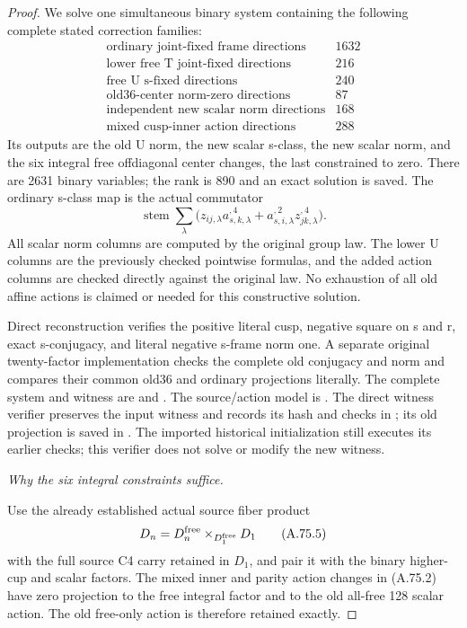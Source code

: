 \begin{proof}
We solve one simultaneous binary system containing the following
complete stated correction families:
\[
\begin{array}{c|r}
 \text{ordinary joint-fixed frame directions}&1632\\
 \text{lower free T joint-fixed directions}&216\\
 \text{free U s-fixed directions}&240\\
 \text{old36-center norm-zero directions}&87\\
 \text{independent new scalar norm directions}&168\\
 \text{mixed cusp-inner action directions}&288
\end{array}
 \tag{A.75.3}
\]
Its outputs are the old U norm, the new scalar s-class, the new
scalar norm, and the six integral free offdiagonal center changes,
the last constrained to zero. There are 2631 binary variables;
the rank is 890 and an exact solution is saved. The ordinary
s-class map is the actual commutator
\[
 \operatorname{stem}\sum_{\lambda}
     \bigl(z_{ij,\lambda}a_{s,k,\lambda}^{,4}
            +a_{s,i,\lambda}^{,2}z_{jk,\lambda}^{,4}\bigr).
 \tag{A.75.4}
\]
All scalar norm columns are computed by the original group law.
The lower U columns are the previously checked pointwise formulas,
and the added action columns are checked directly against the
original law. No exhaustion of all old affine actions is claimed
or needed for this constructive solution.

Direct reconstruction verifies the positive literal cusp, negative
square on s and r, exact s-conjugacy, and literal negative s-frame
norm one. A separate original twenty-factor implementation checks
the complete old conjugacy and norm and compares their common
old36 and ordinary projections literally. The complete system and
witness are
 and
.
The source/action model is
.
The direct witness verifier
preserves the input witness and records its hash and checks in
; its old projection
is saved in .
The imported historical initialization still executes its earlier
checks; this verifier does not solve or modify the new witness.

\emph{Why the six integral constraints suffice.}\par
Use the already established actual source fiber product
\[
 D_n=D_n^{\rm free}\mathbin{\times}_{D_1^{\rm free}}D_1
 \tag{A.75.5}
\]
with the full source C4 carry retained in \(D_1\), and pair it
with the binary higher-cup and scalar factors. The mixed inner
and parity action changes in (A.75.2) have zero projection to the
free integral factor and to the old all-free 128 scalar action.
The old free-only action is therefore retained exactly.


\end{proof}
